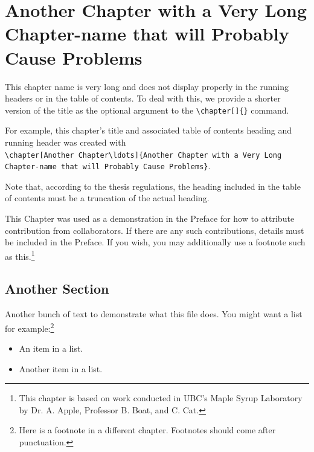 \documentclass[msc,oneside]{ubcthesis}
\begin{document}
\newpage

\chapter[Another Chapter\ldots]{Another Chapter with a Very Long
  Chapter-name that will Probably Cause Problems}
\label{cha:apple_ref}

This chapter name is very long and does not display properly in the
running headers or in the table of contents.  To deal with this, we
provide a shorter version of the title as the optional argument to the
\verb|\chapter[]{}| command.

For example, this chapter's title and associated table of contents heading and
running header was created with\\
\verb|\chapter[Another Chapter\ldots]{Another Chapter with a Very Long|\\
\verb|Chapter-name that will Probably Cause Problems}|.

Note that, according to the thesis regulations, the heading included
in the table of contents must be a truncation of the actual heading.

This Chapter was used as a demonstration in the Preface for how to
attribute contribution from collaborators.  If there are any such
contributions, details must be included in the Preface.  If you wish,
you may additionally use a footnote such as this.\footnote{This
  chapter is based on work conducted in UBC's Maple Syrup Laboratory
  by Dr. A. Apple, Professor B. Boat, and C. Cat.}

\section{Another Section}
Another bunch of text to demonstrate what this file does.
You might want a list for example:\footnote{Here is a footnote in a
  different chapter.  Footnotes should come after punctuation.}
\begin{itemize}
\item An item in a list.
\item Another item in a list.
\end{itemize}
\end{document}

